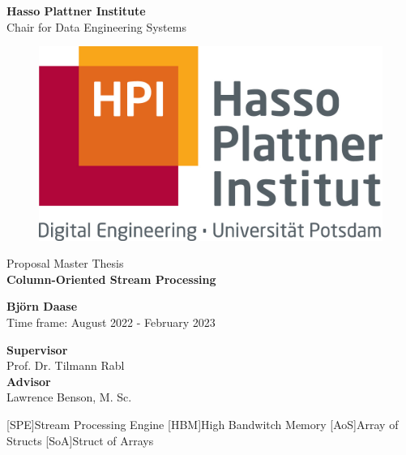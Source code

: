 \documentclass[a4paper, titlepage, 12pt]{article}
\newcommand{\thesisTitle}{Column-Oriented Stream Processing}
\newcommand{\name}{Björn Daase}
\newcommand{\timeFrame}{August 2022 - February 2023}
\newcommand{\supervisor}{Prof. Dr. Tilmann Rabl}
\newcommand{\advisor}{Lawrence Benson, M. Sc.}
\newcommand{\thesisType}{Master}
\begin{document}
\begin{titlepage}
\begin{center}
\LARGE{\textbf{Hasso Plattner Institute}}\\
\normalsize{Chair for Data Engineering Systems}\\[0.3cm]

\begin{figure}[h!]
    \centering
    \includegraphics[width=.3\linewidth]{images/hpi_logo.jpg}
\end{figure}
\vspace{1cm}

\LARGE{Proposal {\thesisType} Thesis}\\[0.7cm]
\Huge{\textbf{\thesisTitle}}

\vspace{1cm} 

\Large{\textbf{\name}} \\[3pt]  
\vspace{0.5cm}
\large{Time frame: \timeFrame} \\ 

\vspace{1cm}

\large{\textbf{Supervisor}}\\
\supervisor\\
\vspace{0.5cm}
\textbf{Advisor}\\
\advisor\\
\end{center}
\end{titlepage}







\clearpage

\begin{acronym}
    [SPE]{Stream Processing Engine}
    [HBM]{High Bandwitch Memory}
    [AoS]{Array of Structs}
    [SoA]{Struct of Arrays}
\end{acronym}


{\small 

}
\end{document}

